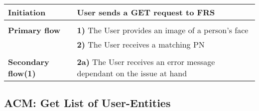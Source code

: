 \documentclass[a4paper,11pt]{article}
\begin{document}
\begin{tabular}{|p{3.5cm}|p{11.5cm}|}
    \textbf{Initiation} & User sends a GET request to FRS
        
    \\ \hline \rowcolor{Gray} & \\ \hline 
         
    \textbf{Primary flow} & 
    \textbf{1)} The User provides an image of a person's face \\&
    \textbf{2)} The User receives a matching PN
        
    \\ \hline \rowcolor{Gray} & \\ \hline 
         
    \textbf{Secondary flow(1)} & 
    \textbf{2a)} The User receives an error message dependant on the issue at hand
    
    \\ \hline 
\end{tabular}


\subsection{ACM: Get List of User-Entities}
\end{document}

